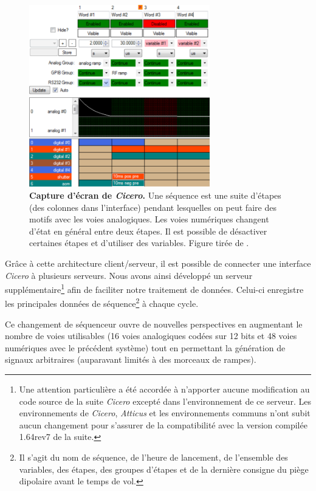 \begin{figure}
\centering
\includegraphics[width=0.7\textwidth]{../Fig/Modif_exp/cicero.png}
\caption{\textbf{Capture d'écran de \emph{Cicero}.} Une séquence est une suite d'étapes (des colonnes dans l'interface) pendant lesquelles on peut faire des motifs avec les voies analogiques. Les voies numériques changent d'état en général entre deux étapes. Il est possible de désactiver certaines étapes et d'utiliser des variables. Figure tirée de \citep{keshet2013distributed}.}
\label{fig:cicero}
\end{figure}

Grâce à cette architecture client/serveur, il est possible de connecter une interface \emph{Cicero} à plusieurs serveurs. Nous avons ainsi développé un serveur supplémentaire\footnote{Une attention particulière a été accordée à n'apporter aucune modification au code source de la suite \emph{Cicero} excepté dans l'environnement de ce serveur. Les environnements de \emph{Cicero}, \emph{Atticus} et les environnements communs n'ont subit aucun changement pour s'assurer de la compatibilité avec la version compilée 1.64rev7 de la suite.} afin de faciliter notre traitement de données. Celui-ci enregistre les principales données de séquence\footnote{Il s'agit du nom de séquence, de l'heure de lancement, de l'ensemble des variables, des étapes, des groupes d'étapes et de la dernière consigne du piège dipolaire avant le temps de vol.} à chaque cycle.

Ce changement de séquenceur ouvre de nouvelles perspectives en augmentant le nombre de voies utilisables (16 voies analogiques codées sur 12 bits et 48 voies numériques avec le précédent système) tout en permettant la génération de signaux arbitraires (auparavant limités à des morceaux de rampes).


